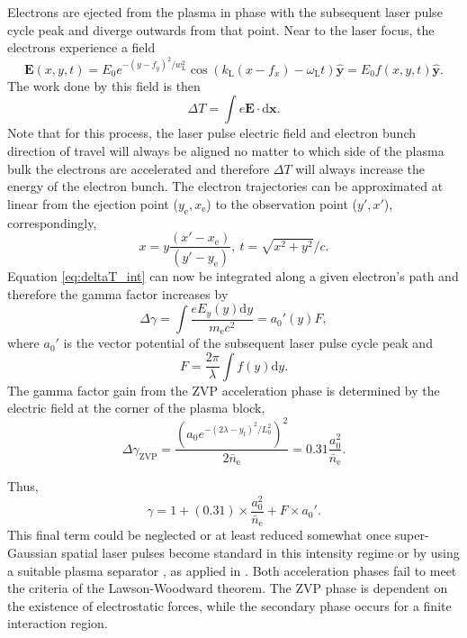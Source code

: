 Electrons are ejected from the plasma in phase with the subsequent laser pulse cycle peak and diverge outwards from that point. Near to the laser focus, the electrons experience a field
\begin{equation}\label{eq:Ey_ejection}
	\mathbf{E}(x,y,t) = E_0 e^{-(y-f_y)^2/w_\mathrm{L}^2}\cos(k_\mathrm{L}(x-f_x) - \omega_\mathrm{L}t) \mathbf{\hat{y}}= E_0 f(x,y,t)  \mathbf{\hat{y}}.
\end{equation}
The work done by this field is then
\begin{equation}\label{eq:deltaT_int}
	\Delta T = \int e \mathbf{E} \cdot \mathrm{d}\mathbf{x}.
\end{equation}
Note that for this process, the laser pulse electric field and electron bunch direction of travel will always be aligned no matter to which side of the plasma bulk the electrons are accelerated and therefore $\Delta T$ will always increase the energy of the electron bunch. The electron trajectories can be approximated at linear from the ejection point ($y_\mathrm{e},x_\mathrm{e}$) to the observation point ($y',x'$), correspondingly,
\begin{equation}
	x = y\frac{(x'-x_\mathrm{e})}{(y'-y_\mathrm{e})}, \ t = \sqrt{x^2 + y^2}/c.
\end{equation}
Equation \ref{eq:deltaT_int} can now be integrated along a given electron's path and therefore the gamma factor increases by
\begin{equation}
	\Delta\gamma = \int\frac{eE_y(y)\mathrm{d}y}{m_\mathrm{e}c^2} = a_0'(y)F,
\end{equation}
where $a_0'$ is the vector potential of the subsequent laser pulse cycle peak and 
\begin{equation}
	F = \frac{2\pi}{\lambda}\int f(y)\mathrm{d}y.
\end{equation}
The gamma factor gain from the ZVP acceleration phase is determined by the electric field at the corner of the plasma block,
\begin{equation}
	\Delta \gamma_\mathrm{ZVP} = \frac{(a_0 e^{-(2\lambda-y_\mathrm{f})^2/L_0^2})^2}{2\bar{n}_\mathrm{e}} = 0.31 \frac{a_0^2}{\bar{n}_\mathrm{e}}.
\end{equation}

Thus,
\begin{equation}\label{eq:gamma}
	\gamma = 1 + (0.31)\times \frac{a_0^2}{\bar{n}_\mathrm{e}} + F\times a_0'.
\end{equation}
This final term could be neglected or at least reduced somewhat once super-Gaussian spatial laser pulses become standard in this intensity regime or by using a suitable plasma separator \cite{miyauchiLaserElectronAcceleration2004}, as applied in \cite{andreevDoubleRelativisticElectron2013}. Both acceleration phases fail to meet the criteria of the Lawson-Woodward theorem. The ZVP phase is dependent on the existence of electrostatic forces, while the secondary phase occurs for a finite interaction region.

